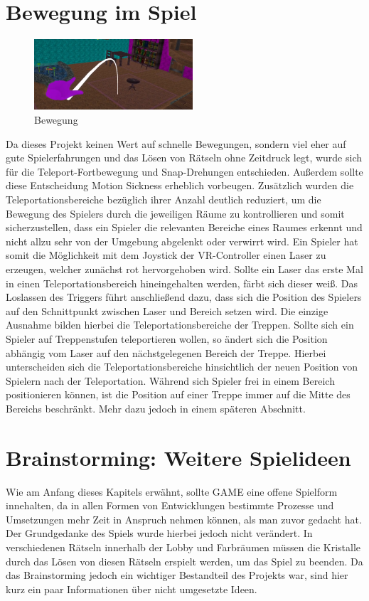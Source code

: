 \section{Bewegung im Spiel}
\begin{figure}
	\vspace*{-0.5cm}
	\includegraphics[width=5.9cm]{Pictures/Bewegung}
	\caption{Bewegung}
	\vspace*{-0.5cm}
	\label{fig:bewegung}
\end{figure}
Da dieses Projekt keinen Wert auf schnelle Bewegungen, sondern viel eher auf gute Spielerfahrungen und das Lösen von Rätseln ohne Zeitdruck legt, wurde sich für die Teleport-Fortbewegung und Snap-Drehungen entschieden. Außerdem sollte diese Entscheidung Motion Sickness erheblich vorbeugen. Zusätzlich wurden die Teleportationsbereiche bezüglich ihrer Anzahl deutlich reduziert, um die Bewegung des Spielers durch die jeweiligen Räume zu kontrollieren und somit sicherzustellen, dass ein Spieler die relevanten Bereiche eines Raumes erkennt und nicht allzu sehr von der Umgebung abgelenkt oder verwirrt wird. Ein Spieler hat somit die Möglichkeit mit dem Joystick der VR-Controller einen Laser zu erzeugen, welcher zunächst rot hervorgehoben wird. Sollte ein Laser das erste Mal in einen Teleportationsbereich hineingehalten werden, färbt sich dieser weiß. Das Loslassen des Triggers führt anschließend dazu, dass sich die Position des Spielers auf den Schnittpunkt zwischen Laser und Bereich setzen wird. Die einzige Ausnahme bilden hierbei die Teleportationsbereiche der Treppen. Sollte sich ein Spieler auf Treppenstufen teleportieren wollen, so ändert sich die Position abhängig vom Laser auf den nächstgelegenen Bereich der Treppe. Hierbei unterscheiden sich die Teleportationsbereiche hinsichtlich der neuen Position von Spielern nach der Teleportation. Während sich Spieler frei in einem Bereich positionieren können, ist die Position auf einer Treppe immer auf die Mitte des Bereichs beschränkt. Mehr dazu jedoch in einem späteren Abschnitt.

\section{Brainstorming: Weitere Spielideen}
Wie am Anfang dieses Kapitels erwähnt, sollte GAME eine offene Spielform innehalten, da in allen Formen von Entwicklungen bestimmte Prozesse und Umsetzungen mehr Zeit in Anspruch nehmen können, als man zuvor gedacht hat. Der Grundgedanke des Spiels wurde hierbei jedoch nicht verändert. In verschiedenen Rätseln innerhalb der Lobby und Farbräumen müssen die Kristalle durch das Lösen von diesen Rätseln erspielt werden, um das Spiel zu beenden. Da das Brainstorming jedoch ein wichtiger Bestandteil des Projekts war, sind hier kurz ein paar Informationen über nicht umgesetzte Ideen.
